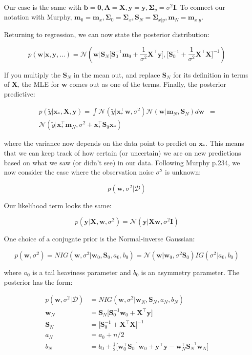 \documentclass{harvardml}
\theoremstyle{definition}
\theoremstyle{plain}
\renewcommand{\v}[1]{\mathbf{#1}}
\begin{document}
\noindent Our case is the same with $\v b = \v 0, \v A = \v X, \v y = \v y, 
\v \Sigma_y = \sigma^2 \v I$. To connect our notation with Murphy, 
$\v m_0 = \v m_x, \v \Sigma_0 = \v \Sigma_{x}, 
\v S_N = \v \Sigma_{x|y}, \v m_N = \v m_{x|y}$.

\newpage

\noindent Returning to regression, we can now state the posterior distribution:

$$ p(\v w | \v x, \v y, ...) = 
    \mathcal{N}(\v w | \v S_N 
    \big[\v S_0^{-1} \v m_0 + \frac{1}{\sigma^2} \v X^\top \v y \big],
    \big[ \v S_0^{-1} + \frac{1}{\sigma^2}\v X^\top \v X\big]^{-1})$$

\noindent If you multiply the $\v S_N$ in the mean out, 
and replace $\v S_N$ for its definition in terms of $\v X$, 
the MLE for $\v w$ comes out as one of the terms.
Finally, the posterior predictive:

\begin{align*}
    p(\tilde{y} | \v x_{*}, \v X ,\v y) = \int 
    \mathcal{N}(\tilde{y}|\v x_{*}^\top \v w, \sigma^2)
    \mathcal{N}(\v w | \v m_N, \v S_N) d \v w &= \\
    \mathcal{N}(\tilde{y} | \v x_{*}^\top \v m_N, 
                \sigma^2 + \v x_{*}^\top \v S_0 \v x_{*})
\end{align*}

\noindent where the variance now depends on the data point to predict on 
$\v x_{*}$. This means that we can keep track of how certain (or uncertain) 
we are on new predictions based on what we saw (or didn't see) in our data.
Following Murphy p.234, we now consider the case where the observation noise 
$\sigma^2$ is unknown:

$$ p(\v w, \sigma^2 | \mathcal{D}) $$

\noindent Our likelihood term looks the same:

$$ p( \v y | \v X, \v w, \sigma^2) = 
   \mathcal{N}(\v y | \v X \v w, \sigma^2 \v I) $$

\noindent One choice of a conjugate prior is the Normal-inverse Gaussian:

$$ p(\v w, \sigma^2) = NIG(\v w, \sigma^2 | \v w_0, \v S_0, a_0, b_0)
   = \mathcal{N}(\v w | \v w_0, \sigma^2 \v S_0) IG(\sigma^2|a_0,b_0)$$

\noindent where $a_0$ is a tail heaviness parameter and $b_0$ is an
asymmetry parameter. The posterior has the form:

\begin{align*}
    p(\v w, \sigma^2 | \mathcal{D}) &= 
    NIG(\v w, \sigma^2 | \v w_N, \v S_N, a_N, b_N)\\
    \v w_N &= \v S_N \big[\v S_0^{-1} \v w_0 + \v X^\top \v y \big]\\
    \v S_N &= \big[\v S_0^{-1} + \v X^\top \v X \big]^{-1}\\
    a_N &= a_0 + n/2\\
    b_N &= b_0 + \frac{1}{2} \big[\v w_0^\top \v S_0^{-1} \v w_0 +
                    \v y^\top \v y - \v w_N^\top \v S_N^{-1} \v w_N \big]
\end{align*}
\end{document}
